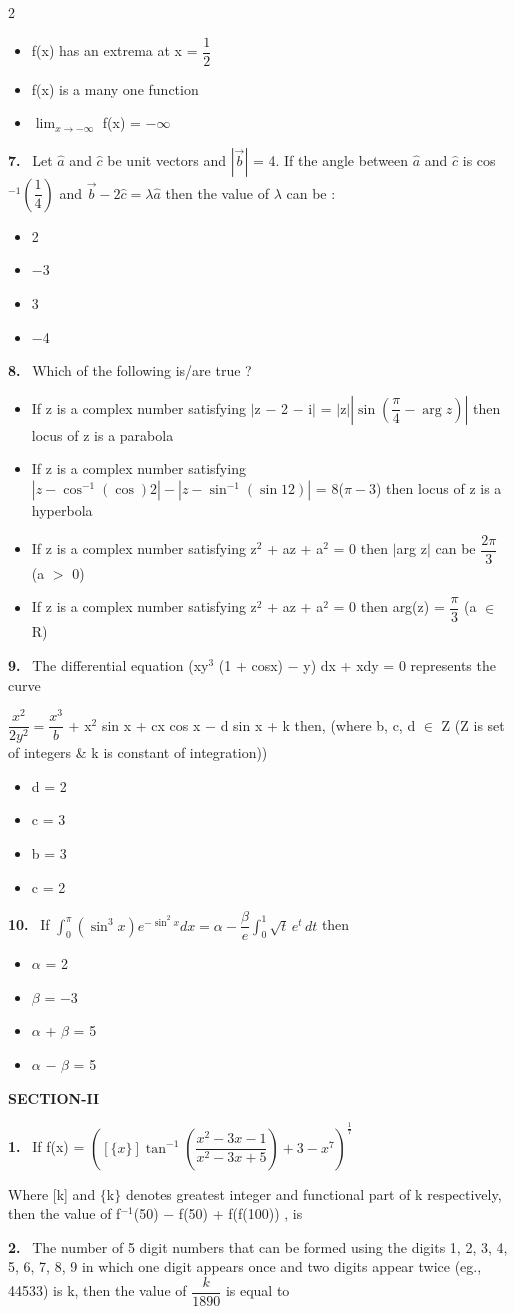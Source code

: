 \documentclass[10pt]{extarticle}
\newcommand{\sect}[1]{\par\smallskip\noindent\textbf{#1}\par}
\newcommand{\qn}[1]{\par\smallskip\noindent\textbf{#1.}~}
\newenvironment{qoptions}{\begin{itemize}[leftmargin=1.8em,itemsep=1pt,topsep=2pt,label={}]}{\end{itemize}}
\newcommand{\opt}[2]{\item[(#1)] #2}
\begin{document}
\begin{multicols}{2}
\begin{qoptions}
\opt{B}{f(x) has an extrema at x = $\dfrac12$}
\opt{C}{f(x) is a many one function}
\opt{D}{$\displaystyle\lim_{x\to-\infty}$ f(x) = $-\infty$}
\end{qoptions}
\qn{7} Let $\hat a$ and $\hat c$ be unit vectors and $\left|\vec b\right|$ = 4. If the angle between $\hat a$ and $\hat c$ is cos$^{-1}\left(\dfrac14\right)$ and $\vec b-2\hat c=\lambda\hat a$ then the value of $\lambda$ can be :
\begin{qoptions}
\opt{A}{2}
\opt{B}{$-$3}
\opt{C}{3}
\opt{D}{$-$4}
\end{qoptions}
\qn{8} Which of the following is/are true ?
\begin{qoptions}
\opt{A}{If z is a complex number satisfying $|$z $-$ 2 $-$ i$|$ = $|$z$|\left|\sin\left(\dfrac\pi4-\arg z\right)\right|$ then locus of z is a parabola}
\opt{B}{If z is a complex number satisfying $\left|z-\cos^{-1}(\cos)2\right|-\left|z-\sin^{-1}(\sin12)\right|$ = 8($\pi-$3) then locus of z is a hyperbola}
\opt{C}{If z is a complex number satisfying z$^2$ + az + a$^2$ = 0 then $|$arg z$|$ can be $\dfrac{2\pi}3$ (a $>$ 0)}
\opt{D}{If z is a complex number satisfying z$^2$ + az + a$^2$ = 0 then arg(z) = $\dfrac\pi3$ (a $\in$ R)}
\end{qoptions}
\qn{9} The differential equation (xy$^3$ (1 + cosx) $-$ y) dx + xdy = 0 represents the curve\par
$\dfrac{x^2}{2y^2}=\dfrac{x^3}b$ + x$^2$ sin x + cx cos x $-$ d sin x + k then, (where b, c, d $\in$ Z (Z is set of integers \& k is constant of integration))
\begin{qoptions}
\opt{A}{d = 2}
\opt{B}{c = 3}
\opt{C}{b = 3}
\opt{D}{c = 2}
\end{qoptions}
\qn{10} If $\displaystyle\int_0^\pi(\sin^3x)e^{-\sin^2x}dx=\alpha-\dfrac\beta e\int_0^1\sqrt t\,e^t\,dt$ then
\begin{qoptions}
\opt{A}{$\alpha$ = 2}
\opt{B}{$\beta$ = $-$3}
\opt{C}{$\alpha$ + $\beta$ = 5}
\opt{D}{$\alpha$ $-$ $\beta$ = 5}
\end{qoptions}
\sect{SECTION-II}
\qn{1} If f(x) = $\left([\{x\}]\tan^{-1}\left(\dfrac{x^2-3x-1}{x^2-3x+5}\right)+3-x^7\right)^{\frac17}$\par
Where [k] and $\{$k$\}$ denotes greatest integer and functional part of k respectively, then the value of f$^{-1}$(50) $-$ f(50) + f(f(100)) , is
\qn{2} The number of 5 digit numbers that can be formed using the digits 1, 2, 3, 4, 5, 6, 7, 8, 9 in which one digit appears once and two digits appear twice (eg., 44533) is k, then the value of $\dfrac k{1890}$ is equal to

\end{multicols}
\end{document}
